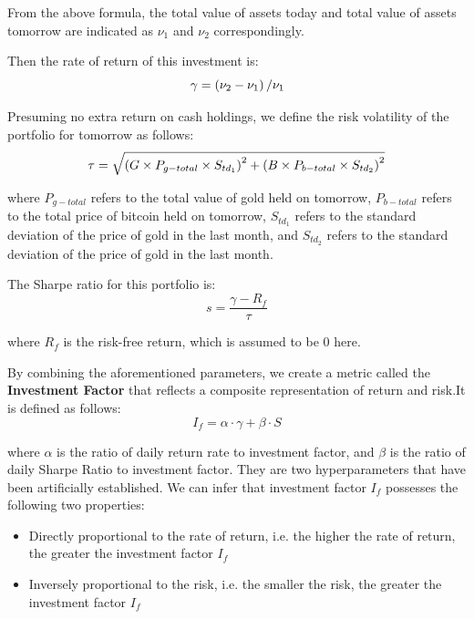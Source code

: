 \documentclass{mcmthesis}
\begin{document}
From the above formula, the total value of assets today and total value of assets tomorrow are indicated as $\nu_{1}$ and $\nu_{2}$ correspondingly.

Then the rate of return of this investment is:
\begin{equation}
	\gamma =\left(\nu _{2}-\nu_{1}\right) / \nu_{1}\\
\end{equation}

Presuming no extra return on cash holdings, we define the risk volatility of the portfolio for tomorrow as follows:
\begin{equation}
\tau =\sqrt{\left(G \times P_{g-total} \times S_{td_{1}}\right)^{2}+\left(B \times P_{b-total} \times S_{td_{2}}\right)^{2}}\\
\end{equation}

where $P_{g-total}$ refers to the total value of gold held on tomorrow, $P_{b-total}$ refers to the total price of bitcoin held on tomorrow, $S_{td_{1}}$ refers to the standard deviation of the price of gold in the last month, and $S_{td_{2}}$ refers to the standard deviation of the price of gold in the last month.

The Sharpe ratio for this portfolio is:
\begin{equation}
	s=\frac{\gamma -R_{f}}{\tau }
\end{equation}

where $R_{f}$ is the risk-free return, which is assumed to be $0$ here.

By combining the aforementioned parameters, we create a metric called the \textbf{Investment Factor} that reflects a composite representation of return and risk.It is defined as follows:
\begin{equation}
	I_{f}= \alpha \cdot \gamma +\beta \cdot S 
\end{equation}

where $\alpha$ is the ratio of daily return rate to investment factor, and $\beta$ is the ratio of daily Sharpe Ratio to investment factor. They are two hyperparameters that have been artificially established.
We can infer that investment factor $I_{f}$ possesses the following two properties:
\begin{itemize}
	\item Directly proportional to the rate of return, i.e. the higher the rate of return, the greater the investment factor $I_{f}$
	\item Inversely proportional to the risk, i.e. the smaller the risk, the greater the investment factor $I_{f}$
\end{itemize}
\end{document}
